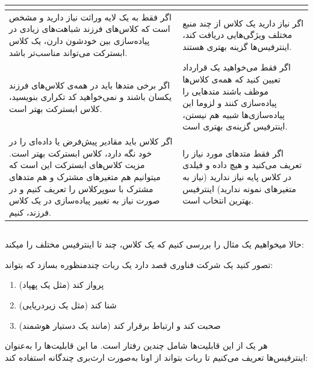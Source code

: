 \begin{table}[H]
	\centering
	\small
	\begin{tabularx}{\textwidth}{>{\raggedright\arraybackslash}X>{\raggedright\arraybackslash}X}
		\hline
		\textbf{\lr{Abstract class}} & \textbf{\lr{Interface}} \\
		\hline
		اگر فقط به یک لایه وراثت نیاز دارید و مشخص است که کلاس‌های فرزند شباهت‌های زیادی در پیاده‌سازی بین خودشون دارن، یک کلاس ابسترکت می‌تواند مناسب‌تر باشد. &
		اگر نیاز دارید یک کلاس از چند منبع مختلف ویژگی‌هایی دریافت کند، اینترفیس‌ها گزینه بهتری هستند. \\
		\hline
		اگر برخی متدها باید در همه‌ی کلاس‌های فرزند یکسان باشند و نمی‌خواهید کد تکراری بنویسید، کلاس ابسترکت بهتر است. &
		اگر فقط می‌خواهید یک قرارداد تعیین کنید که همه‌ی کلاس‌ها موظف باشند متدهایی را پیاده‌سازی کنند و لزوما این پیاده‌سازی‌ها شبیه هم نیستن، اینترفیس گزینه‌ی بهتری است. \\
		\hline
		اگر کلاس باید مقادیر پیش‌فرض یا داده‌ای را در خود نگه دارد، کلاس ابسترکت بهتر است. مزیت کلاس‌های ابسترکت این است که میتوانیم هم متغیرهای مشترک و هم متدهای مشترک با سوپرکلاس را تعریف کنیم و در صورت نیاز به تغییر پیاده‌سازی در یک کلاس فرزند، \lr{override} کنیم. &
		اگر فقط متدهای مورد نیاز را تعریف می‌کنید و هیچ داده‌ و فیلدی در کلاس پایه نیاز ندارید (نیاز به متغیرهای نمونه ندارید) اینترفیس بهترین انتخاب است. \\
		\hline
	\end{tabularx}
\end{table}

\subsection{}

حالا میخواهیم یک مثال را بررسی کنیم که یک کلاس، چند تا اینترفیس مختلف را
 میکند:

تصور کنید یک شرکت فناوری قصد دارد یک ربات چندمنظوره بسازد که بتواند:

\begin{enumerate}
\def\labelenumi{\arabic{enumi}.}
\tightlist
\item
  پرواز کند (مثل یک پهپاد)
\item
  شنا کند (مثل یک زیردریایی)
\item
  صحبت کند و ارتباط برقرار کند (مانند یک دستیار هوشمند)
\end{enumerate}

هر یک از این قابلیت‌ها شامل چندین رفتار است. ما این قابلیت‌ها را به‌عنوان
اینترفیس‌ها تعریف می‌کنیم تا ربات بتواند از اونا به‌صورت ارث‌بری چندگانه
استفاده کند:

